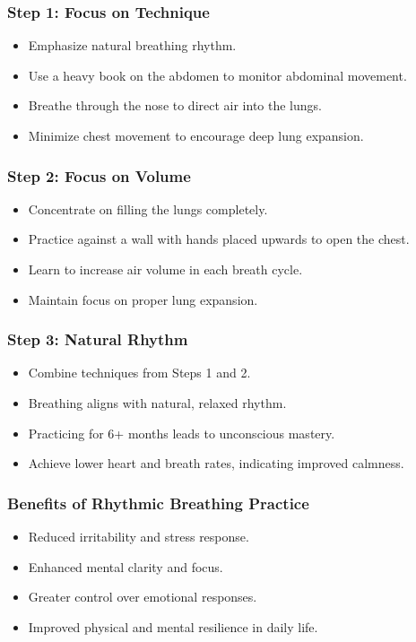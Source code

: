 \begin{frame}[fragile]\frametitle{Step 1: Focus on Technique}
    \begin{itemize}
        \item Emphasize natural breathing rhythm.
        \item Use a heavy book on the abdomen to monitor abdominal movement.
        \item Breathe through the nose to direct air into the lungs.
        \item Minimize chest movement to encourage deep lung expansion.
    \end{itemize}
\end{frame}

\begin{frame}[fragile]\frametitle{Step 2: Focus on Volume}
    \begin{itemize}
        \item Concentrate on filling the lungs completely.
        \item Practice against a wall with hands placed upwards to open the chest.
        \item Learn to increase air volume in each breath cycle.
        \item Maintain focus on proper lung expansion.
    \end{itemize}
\end{frame}

\begin{frame}[fragile]\frametitle{Step 3: Natural Rhythm}
    \begin{itemize}
        \item Combine techniques from Steps 1 and 2.
        \item Breathing aligns with natural, relaxed rhythm.
        \item Practicing for 6+ months leads to unconscious mastery.
        \item Achieve lower heart and breath rates, indicating improved calmness.
    \end{itemize}
\end{frame}

\begin{frame}[fragile]\frametitle{Benefits of Rhythmic Breathing Practice}
    \begin{itemize}
        \item Reduced irritability and stress response.
        \item Enhanced mental clarity and focus.
        \item Greater control over emotional responses.
        \item Improved physical and mental resilience in daily life.
    \end{itemize}
\end{frame}

